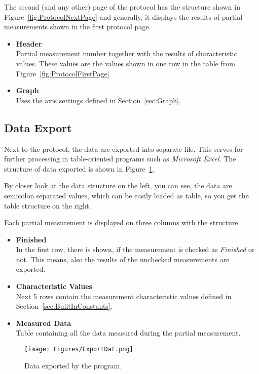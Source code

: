 \documentclass[a4paper,11pt,oneside]{report}
\theoremstyle{named}
\begin{document}
The second (and any other) page of the protocol has the structure shown in
Figure~\ref{fig:ProtocolNextPage} and generally, it displays the results of
partial measurements shown in the first protocol page.

\begin{itemize}
  \item \textbf{Header} \\
    Partial measurement number together with the results of characteristic
    values. These values are the values shown in one row in the table from
    Figure~\ref{fig:ProtocolFirstPage}.
  \item \textbf{Graph} \\
    Uses the axis settings defined in Section~\ref{sec:Graph}.
\end{itemize}

\subsection{Data Export}
\label{sec:DataExport}

Next to the protocol, the data are exported into separate file. This serves for
further processing in table-oriented programs such as \textit{Microsoft Excel}.
The structure of data exported is shown in Figure~\ref{fig:ExportDat}.

By closer look at the data structure on the left, you can see, the data are
semicolon separated values, which can be easily loaded as table, so you get 
the table structure on the right.

Each partial measurement is displayed on three columns with the structure

\begin{itemize}
  \item \textbf{Finished} \\
    In the first row, there is shown, if the measurement is checked as
    \textit{Finished} or not. This means, also the results of the unchecked
    measurements are exported.
  \item \textbf{Characteristic Values} \\
    Next 5 rows contain the measurement characteristic values defined in
    Section~\ref{sec:BulitInConstants}.
  \item \textbf{Measured Data} \\
    Table containing all the data measured during the partial measurement. 
\end{itemize}

\begin{figure}[t]
  \centering
  \texttt{[image: Figures/ExportDat.png]}
  \caption{Data exported by the program.}
  \label{fig:ExportDat}
\end{figure}
\end{document}

